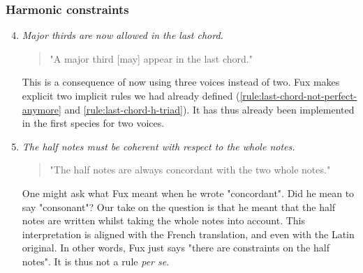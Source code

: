 \subsubsection{Harmonic constraints}
\begin{enumerate}[wide, label=\bfseries 2.H\arabic*]
\setcounter{enumi}{3} %
    \item \textit{Major thirds are now allowed in the last chord.} \label{rule:major-third-last-chord}    
    \begin{quotation}
        "A major third [may] appear in the last chord."
        \textcite[p.87]{GaPEng}
    \end{quotation}
    This is a consequence of now using three voices instead of two. Fux makes explicit two implicit rules we had already defined (\ref{rule:last-chord-not-perfect-anymore} and \ref{rule:last-chord-h-triad}). It has thus already been implemented in the first species for two voices.

    \item \textit{The half notes must be coherent with respect to the whole notes.} \label{rule:coherent}    
    \begin{quotation}
        "The half notes are always concordant with the two whole notes."
        \textcite[p.88]{GaPEng}
    \end{quotation}
    One might ask what Fux meant when he wrote "concordant". Did he mean to say "consonant"? Our take on the question is that he meant that the half notes are written whilst taking the whole notes into account. This interpretation is aligned with the French translation, and even with the Latin original. In other words, Fux just says "there are constraints on the half notes". It is thus not a rule \textit{per se}.
\end{enumerate}

